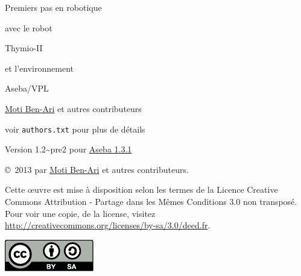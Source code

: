 \thispagestyle{empty}

\begin{center}
\begin{Huge}
\begin{bfseries}
Premiers pas en robotique
\end{bfseries}

avec le robot

\begin{bfseries}
Thymio-II
\end{bfseries}

et l'environnement

\begin{bfseries}
Aseba/VPL
\end{bfseries}

\end{Huge}

\vskip 2cm

\begin{LARGE}
\href{http://www.weizmann.ac.il/sci-tea/benari/}{Moti Ben-Ari} et autres contributeurs\\
\end{LARGE}
\bigskip
\begin{Large}
voir \texttt{authors.txt} pour plus de détails
\end{Large}

\vskip 1cm

\begin{Large}
Version 1.2{\textasciitilde}pre2 pour \href{https://aseba.wikidot.com/fr:downloadinstall}{Aseba 1.3.1}
\end{Large}

\end{center}

\vfill

\begin{center}
\copyright{}\  2013 par \href{http://www.weizmann.ac.il/sci-tea/benari/}{Moti Ben-Ari} et autres contributeurs.
\end{center}

Cette œuvre est mise à disposition selon les termes de la Licence Creative Commons Attribution - Partage dans les Mêmes Conditions 3.0 non transposé.
Pour voir une copie, de la license, visitez \url{http://creativecommons.org/licenses/by-sa/3.0/deed.fr}.

\begin{center}
\includegraphics[width=.2\textwidth]{../images/by-sa}
\end{center}
